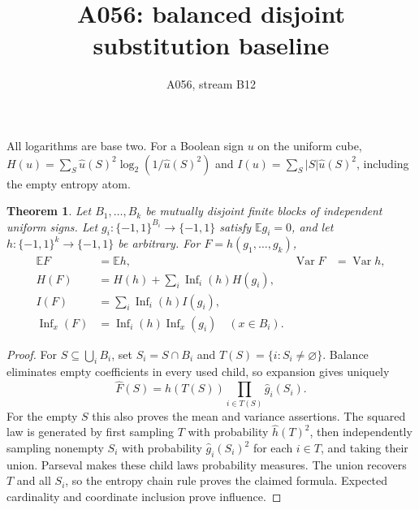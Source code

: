 \documentclass{article}
\newtheorem{theorem}{Theorem}
\begin{document}
\title{A056: balanced disjoint substitution baseline}
\author{A056, stream B12}
\maketitle
All logarithms are base two. For a Boolean sign $u$ on the uniform cube,
$H(u)=\sum_S\widehat u(S)^2\log_2(1/\widehat u(S)^2)$ and
$I(u)=\sum_S|S|\widehat u(S)^2$, including the empty entropy atom.
\begin{theorem}
Let $B_1,\ldots,B_k$ be mutually disjoint finite blocks of independent
uniform signs. Let $g_i:\{-1,1\}^{B_i}\to\{-1,1\}$ satisfy
$\mathbb E g_i=0$, and let $h:\{-1,1\}^k\to\{-1,1\}$ be arbitrary.
For $F=h(g_1,\ldots,g_k)$,
\begin{align*}
\mathbb EF&=\mathbb Eh,&\operatorname{Var}F&=\operatorname{Var}h,\\
H(F)&=H(h)+\sum_i\operatorname{Inf}_i(h)H(g_i),\\
I(F)&=\sum_i\operatorname{Inf}_i(h)I(g_i),\\
\operatorname{Inf}_x(F)&=\operatorname{Inf}_i(h)\operatorname{Inf}_x(g_i)
\quad(x\in B_i).
\end{align*}
\end{theorem}
\begin{proof}
For $S\subseteq\bigcup_i B_i$, set $S_i=S\cap B_i$ and
$T(S)=\{i:S_i\ne\varnothing\}$. Balance eliminates empty coefficients
in every used child, so expansion gives uniquely
\[
\widehat F(S)=\widehat h(T(S))\prod_{i\in T(S)}\widehat g_i(S_i).
\]
For the empty $S$ this also proves the mean and variance assertions.
The squared law is generated by first sampling $T$ with probability
$\widehat h(T)^2$, then independently sampling nonempty $S_i$ with
probability $\widehat g_i(S_i)^2$ for each $i\in T$, and taking their
union. Parseval makes these child laws probability measures. The union
recovers $T$ and all $S_i$, so the entropy chain rule proves the claimed
formula. Expected cardinality and coordinate inclusion prove influence.
\end{proof}
\end{document}
